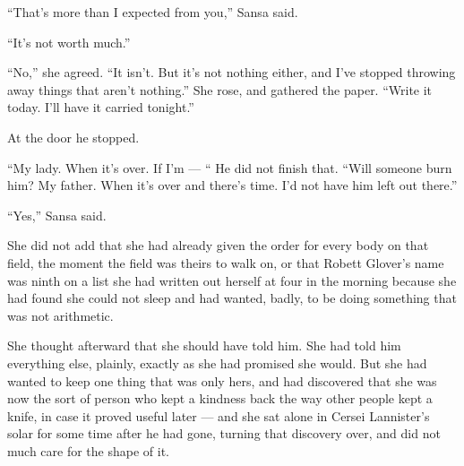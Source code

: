 “That’s more than I expected from you,” Sansa said.

“It’s not worth much.”

“No,” she agreed. “It isn’t. But it’s not nothing either, and I’ve stopped throwing away things that aren’t nothing.” She rose, and gathered the paper. “Write it today. I’ll have it carried tonight.”

At the door he stopped.

“My lady. When it’s over. If I’m — “ He did not finish that. “Will someone burn him? My father. When it’s over and there’s time. I’d not have him left out there.”

“Yes,” Sansa said.

She did not add that she had already given the order for every body on that field, the moment the field was theirs to walk on, or that Robett Glover’s name was ninth on a list she had written out herself at four in the morning because she had found she could not sleep and had wanted, badly, to be doing something that was not arithmetic.

She thought afterward that she should have told him. She had told him everything else, plainly, exactly as she had promised she would. But she had wanted to keep one thing that was only hers, and had discovered that she was now the sort of person who kept a kindness back the way other people kept a knife, in case it proved useful later — and she sat alone in Cersei Lannister’s solar for some time after he had gone, turning that discovery over, and did not much care for the shape of it.